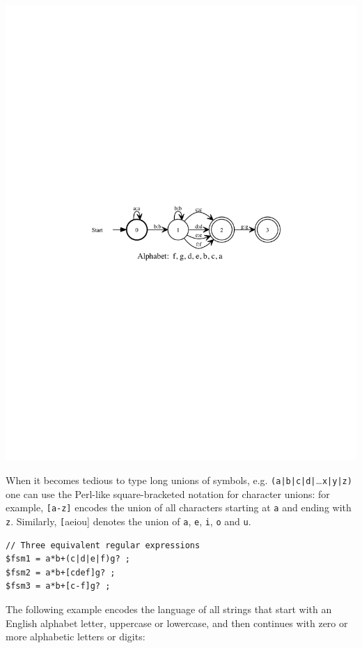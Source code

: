 \begin{center}
\includegraphics{images/infin.pdf}
\end{center}

When it becomes tedious to type long unions of symbols, e.g.
\texttt{(a|b|c|d|}\ldots{}\texttt{x|y|z)} one can
use the Perl-like square-bracketed notation for character unions: for
example, \texttt{[a-z]} encodes the union of all characters starting at
\texttt{a} and ending with \texttt{z}.  Similarly, \texttt[aeiou] denotes
the union of \texttt{a}, \texttt{e}, \texttt{i}, \texttt{o} and \texttt{u}.


\begin{Verbatim}
// Three equivalent regular expressions
$fsm1 = a*b+(c|d|e|f)g? ;
$fsm2 = a*b+[cdef]g? ;
$fsm3 = a*b+[c-f]g? ;
\end{Verbatim}

\noindent
The following example encodes the language of all strings that start with an English
alphabet letter, uppercase or lowercase, and then continues with zero or more alphabetic letters or digits:


